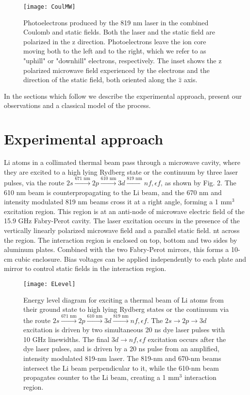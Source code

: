 \documentclass[aps,pra,preprint,groupedaddress]{revtex4-1}
\begin{document}
\begin{figure}
	\texttt{[image: CoulMW]}
	\caption{Photoelectrons produced by the 819 nm laser in the combined Coulomb and static fields. Both the laser and the static field are polarized in the z direction. Photoelectrons leave the ion core moving both to the left and to the right, which we refer to as "uphill" or "downhill" electrons, respectively. The inset shows the z polarized microwave field experienced by the electrons and the direction of the static field, both oriented along the $\hat{z}$ axis.}
	\label{fig:CoulMW}
\end{figure}
In the sections which follow we describe the experimental approach, present our observations and a classical model of the process.


\section{\label{sec:exp} Experimental approach}


Li atoms in a collimated thermal beam pass through a microwave cavity, where they are excited to a high lying Rydberg state or the continuum by three laser pulses, via the route $2s \xrightarrow{\text{671 nm}} 2p \xrightarrow{\text{610 nm}} 3d \xrightarrow{\text{819 nm}} nf, \epsilon f$, as shown by Fig. 2. The 610 nm beam is counterpropagating to the Li beam, and the 670 nm and intensity modulated 819 nm beams cross it at a right angle, forming a 1 mm$^3$ excitation region. This region is at an anti-node of microwave electric field of the 15.9 GHz Fabry-Perot cavity. The laser excitation occurs in the presence of the vertically linearly polarized microwave field and a parallel static field. nt across the region. The interaction region is enclosed on top, bottom and two sides by aluminum plates. Combined with the two Fabry-Perot mirrors, this forms a 10-cm cubic enclosure. Bias voltages can be applied independently to each plate and mirror to control static fields in the interaction region.



\begin{figure}
	\texttt{[image: ELevel]}
	\caption{Energy level diagram for exciting a thermal beam of Li atoms from their ground state to high lying Rydberg states or the continuum via the route $2s \xrightarrow{\text{671 nm}} 2p \xrightarrow{\text{610 nm}} 3d \xrightarrow{\text{819 nm}} nf, \epsilon f$. The $2s \rightarrow 2p \rightarrow 3d$ excitation is driven by two simultaneous 20 ns dye laser pulses with 10 GHz linewidths. The final $3d \rightarrow nf, \epsilon f$ excitation occurs after the dye laser pulses, and is driven by a 20 ns pulse from an amplified, intensity modulated 819-nm laser. The 819-nm and 670-nm beams intersect the Li beam perpendicular to it, while the 610-nm beam propagates counter to the Li beam, creating a 1 mm$^3$ interaction region.}
	\label{fig:ELev}
\end{figure}
\end{document}
